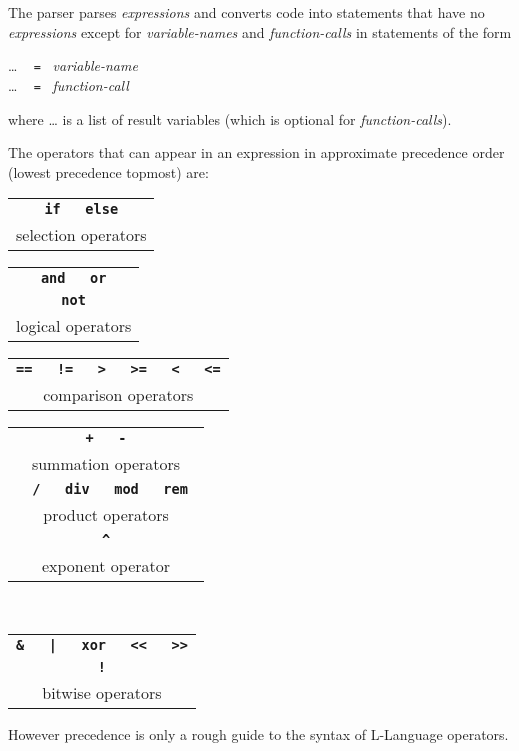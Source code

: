 \documentclass[12pt]{article}
\newcommand{\TT}[1]{{\tt \bfseries #1}}
\newenvironment{indpar}[1][0.3in]%
	{\begin{list}{}%
		     {\setlength{\itemsep}{0in}%
		      \setlength{\topsep}{0in}%
		      \setlength{\parsep}{1ex}%
		      \setlength{\labelwidth}{#1}%
		      \setlength{\leftmargin}{#1}%
		      \addtolength{\leftmargin}{\labelsep}}%
	 \item}%
	{\end{list}}
\begin{document}
The parser parses {\em expressions} and converts code into statements
that have no {\em expressions} except for {\em variable-names}
and {\em function-calls} in statements of the form
\begin{indpar}
\ldots{} ~ {\tt =} ~{\em variable-name \\}
\ldots{} ~ {\tt =} ~{\em function-call}
\end{indpar}
where \ldots{} is a list of result variables (which is optional
for {\em function-calls}).

The operators that can appear in an expression in approximate
precedence order (lowest precedence topmost) are:

\begin{center}

\begin{tabular}{c}
\TT{if ~ else} \\
selection operators
\end{tabular}

\medskip

\begin{tabular}{c}
\TT{and ~ or} \\
\TT{not} \\
logical operators
\end{tabular}

\medskip

\begin{tabular}{c}
\TT{== ~ != ~ > ~ >= ~ < ~ <=} \\
comparison operators
\end{tabular}

\medskip

\begin{tabular}[t]{c}
\TT{+ ~ -} \\
summation operators
\\[2ex]
\TT{* ~ / ~ div ~ mod ~ rem } \\
product operators
\\[2ex]
\TT{\textasciicircum} \\
exponent operator
\end{tabular}
~~~~~
\begin{tabular}[t]{c}
\TT{\& ~ | ~ xor ~ <{}< ~ >{}>} \\
\TT{!} \\
bitwise operators
\end{tabular}

\end{center}

However precedence is only a rough guide to the syntax of L-Language
operators.
\end{document}
